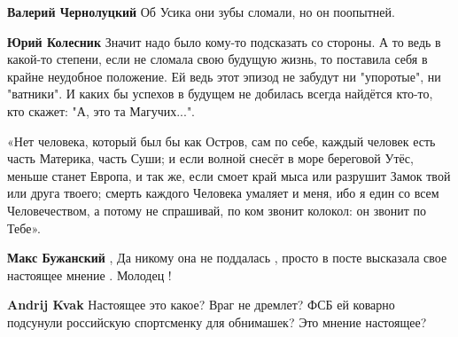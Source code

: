 \begin{itemize}
\begin{itemize}
\textbf{Валерий Чернолуцкий} Об Усика они зубы сломали, но он поопытней.

 
\textbf{Юрий Колесник} 
Значит надо было кому-то подсказать со стороны. А то ведь в какой-то степени,
если не сломала свою будущую жизнь, то поставила себя в крайне неудобное
положение. Ей ведь этот эпизод не забудут ни "упоротые", ни "ватники". И каких
бы успехов в будущем не добилась всегда найдётся кто-то, кто скажет: "А, это та
Магучих...".

\end{itemize}

 

«Нет человека, который был бы как Остров, сам по себе, каждый человек есть
часть Материка, часть Суши; и если волной снесёт в море береговой Утёс, меньше
станет Европа, и так же, если смоет край мыса или разрушит Замок твой или друга
твоего; смерть каждого Человека умаляет и меня, ибо я един со всем
Человечеством, а потому не спрашивай, по ком звонит колокол: он звонит по
Тебе».


 
\textbf{Макс Бужанский} , Да никому она не поддалась , просто в посте высказала свое настоящее мнение . Молодец !

\begin{itemize}
 
\textbf{Andrij Kvak} Настоящее это какое? Враг не дремлет? ФСБ ей коварно подсунули российскую спортсменку для обнимашек? Это мнение настоящее?
\end{itemize}


\end{itemize}
